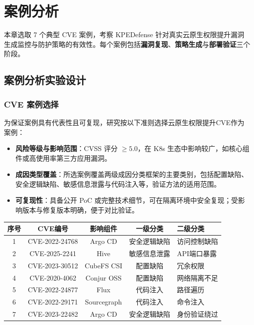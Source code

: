 
\chapter{案例分析}\label{chap:case}
本章选取 7 个典型 CVE 案例，考察 KPEDefense 针对真实云原生权限提升漏洞生成监控与防护策略的有效性。每个案例包括\textbf{漏洞复现}、\textbf{策略生成}与\textbf{部署验证}三个阶段。


\section{案例分析实验设计}

\subsection{CVE 案例选择}

为保证案例具有代表性且可复现，研究按以下准则选择云原生权限提升CVE作为案例：

\begin{itemize}
    \item \textbf{风险等级与影响范围}：CVSS 评分 $\geq 5.0$，在 K8s 生态中影响较广，如核心组件或高使用率第三方应用漏洞。
    \item \textbf{成因类型覆盖}：所选案例覆盖两级成因分类框架的主要类别，包括配置缺陷、安全逻辑缺陷、敏感信息泄露与代码注入等，验证方法的适用范围。
    \item \textbf{可复现性}：具备公开 PoC 或完整技术细节，可在隔离环境中安全复现；受影响版本与修复版本明确，便于对比验证。
\end{itemize}

\begin{table}[htb]
    \centering{}\label{tab:cve-summary}
    \noindent\renewcommand{\arraystretch}{1.3}
    \setlength{\tabcolsep}{4pt}
    \begin{tabularx}{0.92\linewidth}{c c c c X}
        \toprule
        \textbf{序号} & \textbf{CVE编号} & \textbf{影响组件} & \textbf{一级分类} & \textbf{二级分类} \\
        \midrule
        1 & CVE-2022-24768 & Argo CD & 安全逻辑缺陷 & 访问控制缺陷 \\
        2 & CVE-2025-2241 & Hive & 敏感信息泄露 & API端口暴露 \\
        3 & CVE-2023-30512 & CubeFS CSI & 配置缺陷 & 冗余权限 \\
        4 & CVE-2020-4062 & Conjur OSS & 配置缺陷 & 网络隔离不足 \\
        5 & CVE-2022-24877 & Flux & 代码注入 & 路径遍历 \\
        6 & CVE-2022-29171 & Sourcegraph & 代码注入 & 命令注入 \\
        7 & CVE-2023-22482 & Argo CD & 安全逻辑缺陷 & 身份验证绕过 \\
        \bottomrule
    \end{tabularx}
\end{table}


